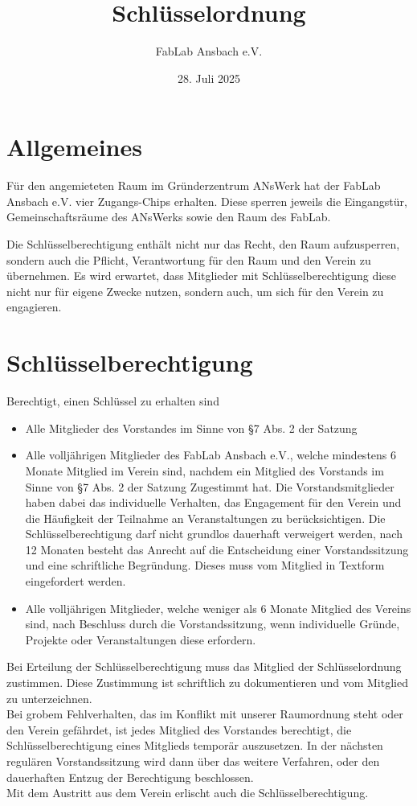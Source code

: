 \title{Schlüsselordnung}
\author{FabLab Ansbach e.V.}
\date{28. Juli 2025}




\maketitle

\section{Allgemeines}
Für den angemieteten Raum im Gründerzentrum ANsWerk hat der FabLab Ansbach e.V. vier Zugangs-Chips erhalten. Diese sperren jeweils die Eingangstür, Gemeinschaftsräume des ANsWerks sowie den Raum des FabLab.

Die Schlüsselberechtigung enthält nicht nur das Recht, den Raum aufzusperren, sondern auch die Pflicht, Verantwortung für den Raum und den Verein zu übernehmen. Es wird erwartet, dass Mitglieder mit Schlüsselberechtigung diese nicht nur für eigene Zwecke nutzen, sondern auch, um sich für den Verein zu engagieren.

\section{Schlüsselberechtigung}
Berechtigt, einen Schlüssel zu erhalten sind
\begin{itemize}
    \item Alle Mitglieder des Vorstandes im Sinne von §7 Abs. 2 der Satzung
    \item Alle volljährigen Mitglieder des FabLab Ansbach e.V., welche mindestens 6 Monate Mitglied im Verein sind, nachdem ein Mitglied des Vorstands im Sinne von §7 Abs. 2 der Satzung Zugestimmt hat. Die Vorstandsmitglieder haben dabei das individuelle Verhalten, das Engagement für den Verein und die Häufigkeit der Teilnahme an Veranstaltungen zu berücksichtigen. Die Schlüsselberechtigung darf nicht grundlos dauerhaft verweigert werden, nach 12 Monaten besteht das Anrecht auf die Entscheidung einer Vorstandssitzung und eine schriftliche Begründung. Dieses muss vom Mitglied in Textform eingefordert werden.
    \item Alle volljährigen Mitglieder, welche weniger als 6 Monate Mitglied des Vereins sind, nach Beschluss durch die Vorstandssitzung, wenn individuelle Gründe, Projekte oder Veranstaltungen diese erfordern.
\end{itemize}
Bei Erteilung der Schlüsselberechtigung muss das Mitglied der Schlüsselordnung zustimmen. Diese Zustimmung ist schriftlich zu dokumentieren und vom Mitglied zu unterzeichnen.\\
Bei grobem Fehlverhalten, das im Konflikt mit unserer Raumordnung steht oder den Verein gefährdet, ist jedes Mitglied des Vorstandes berechtigt, die Schlüsselberechtigung eines Mitglieds temporär auszusetzen. In der nächsten regulären Vorstandssitzung wird dann über das weitere Verfahren, oder den dauerhaften Entzug der Berechtigung beschlossen.\\
Mit dem Austritt aus dem Verein erlischt auch die Schlüsselberechtigung.

